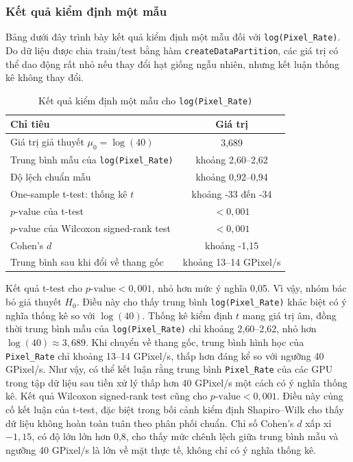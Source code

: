 \subsubsection{Kết quả kiểm định một mẫu}
Bảng dưới đây trình bày kết quả kiểm định một mẫu đối với \texttt{log(Pixel\_Rate)}. Do dữ liệu được chia train/test bằng hàm \texttt{createDataPartition}, các giá trị có thể dao động rất nhỏ nếu thay đổi hạt giống ngẫu nhiên, nhưng kết luận thống kê không thay đổi.
\begin{table}[htbp]
\centering
\caption{Kết quả kiểm định một mẫu cho \texttt{log(Pixel\_Rate)}}
\label{tab:one_sample_pixelrate}
\small
\begin{tabular}{|l|c|}
\hline
\textbf{Chỉ tiêu} & \textbf{Giá trị} \\
\hline
Giá trị giả thuyết $\mu_0 = \log(40)$ & 3{,}689 \\
\hline
Trung bình mẫu của \texttt{log(Pixel\_Rate)} & khoảng 2{,}60--2{,}62 \\
\hline
Độ lệch chuẩn mẫu & khoảng 0{,}92--0{,}94 \\
\hline
One-sample t-test: thống kê $t$ & khoảng -33 đến -34 \\
\hline
$p\text{-value}$ của t-test & $<0{,}001$ \\
\hline
$p\text{-value}$ của Wilcoxon signed-rank test & $<0{,}001$ \\
\hline
Cohen's $d$ & khoảng -1{,}15 \\
\hline
Trung bình sau khi đổi về thang gốc & khoảng 13--14 GPixel/s \\
\hline
\end{tabular}
\end{table}

Kết quả t-test cho $p\text{-value} < 0{,}001$, nhỏ hơn mức ý nghĩa 0{,}05. Vì vậy, nhóm bác bỏ giả thuyết $H_0$. Điều này cho thấy trung bình \texttt{log(Pixel\_Rate)} khác biệt có ý nghĩa thống kê so với $\log(40)$.
Thống kê kiểm định $t$ mang giá trị âm, đồng thời trung bình mẫu của \texttt{log(Pixel\_Rate)} chỉ khoảng 2{,}60--2{,}62, nhỏ hơn $\log(40) \approx 3{,}689$. Khi chuyển về thang gốc, trung bình hình học của \texttt{Pixel\_Rate} chỉ khoảng 13--14 GPixel/s, thấp hơn đáng kể so với ngưỡng 40 GPixel/s. Như vậy, có thể kết luận rằng trung bình \texttt{Pixel\_Rate} của các GPU trong tập dữ liệu sau tiền xử lý thấp hơn 40 GPixel/s một cách có ý nghĩa thống kê.
Kết quả Wilcoxon signed-rank test cũng cho $p\text{-value} < 0{,}001$. Điều này củng cố kết luận của t-test, đặc biệt trong bối cảnh kiểm định Shapiro--Wilk cho thấy dữ liệu không hoàn toàn tuân theo phân phối chuẩn. Chỉ số Cohen's $d$ xấp xỉ $-1{,}15$, có độ lớn lớn hơn 0{,}8, cho thấy mức chênh lệch giữa trung bình mẫu và ngưỡng 40 GPixel/s là lớn về mặt thực tế, không chỉ có ý nghĩa thống kê.
